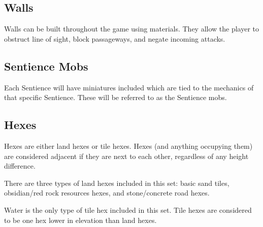 \documentclass[../main.tex]{subfiles}
\begin{document}
\subsection{Walls}
Walls can be built throughout the game using materials. They allow the player to obstruct line of sight, block passageways, and negate incoming attacks. 

\subsection{Sentience Mobs}
Each Sentience will have miniatures included which are tied to the mechanics of that specific Sentience. These will be referred to as the Sentience mobs. 

\subsection{Hexes}
Hexes are either land hexes or tile hexes. Hexes (and anything occupying them) are considered adjacent if they are next to each other, regardless of any height difference. 

There are three types of land hexes included in this set: basic sand tiles, obsidian/red rock resources hexes, and stone/concrete road hexes. 

Water is the only type of tile hex included in this set. Tile hexes are considered to be one hex lower in elevation than land hexes. 

\clearpage
\end{document}
